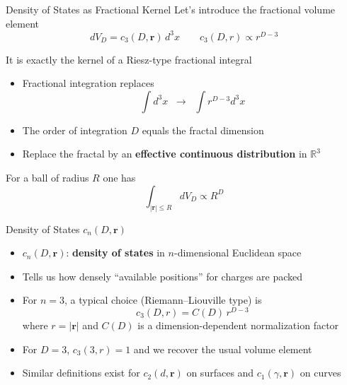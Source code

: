 \documentclass[11pt]{beamer}
\begin{document}
\begin{frame}{Density of States as Fractional Kernel}
Let's introduce the fractional volume element
\begin{equation*}
  dV_D = c_3(D,\bm r)\, d^3x
  \qquad
  c_3(D,r) \propto r^{D-3}
\end{equation*}

It is exactly the kernel of a Riesz-type fractional integral


\begin{itemize}
  \item Fractional integration replaces
  \[
    \int d^3x \;\;\to\;\; \int r^{D-3} d^3x
  \]
  \item The order of integration $D$ equals the fractal dimension
  \item Replace the fractal by an \textbf{effective continuous distribution} in $\mathbb{R}^3$
\end{itemize}

For a ball of radius $R$ one has
\begin{equation*}
  \int_{|\bm r| \le R} dV_D \propto R^D
\end{equation*}

\end{frame}


\begin{frame}{Density of States $c_n(D,\bm r)$}
\begin{itemize}
  \item $c_n(D,\bm r)$: \textbf{density of states} in $n$-dimensional Euclidean space
  \item Tells us how densely “available positions” for charges are packed
  \item For $n=3$, a typical choice (Riemann--Liouville type) is
    \begin{equation*}
      c_3(D,r) = C(D)\, r^{D-3}
    \end{equation*}
  where $r = |\bm r|$ and $C(D)$ is a dimension-dependent normalization factor
  \item For $D = 3$, $c_3(3,r) = 1$ and we recover the usual volume element
  \item Similar definitions exist for $c_2(d,\bm r)$ on surfaces and $c_1(\gamma,\bm r)$ on curves
\end{itemize}
\end{frame}
\end{document}
